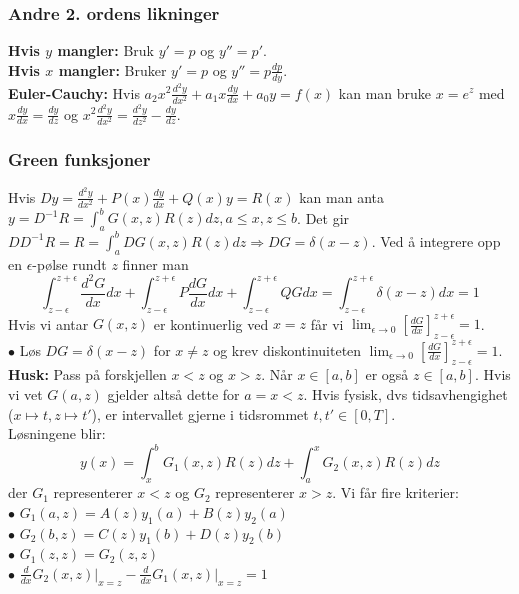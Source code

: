 \documentclass[a4paper, norsk, 8pt]{article}
\newcommand{\DIFF}[2]{ \frac{d#1}{d#2} }
\begin{document}
\begin{multicols*}{2}
\subsubsection*{\small Andre 2. ordens likninger}
\textbf{Hvis $y$ mangler:} Bruk $y'=p$ og $y''=p'$.\\
\textbf{Hvis $x$ mangler:} Bruker $y'=p$ og $y''=p\DIFF{p}{y}$.\\
\textbf{Euler-Cauchy:} Hvis $a_2 x^2 \DIFF{^2y}{x^2} + a_1x\DIFF{y}{x}+a_0y=f(x)$ kan man bruke $x=e^{z}$ med $x\DIFF{y}{x}=\DIFF{y}{z}$ og $x^2\DIFF{^2y}{x^2}=\DIFF{^2y}{z^2}-\DIFF{y}{z}$.

\subsubsection*{\small Green funksjoner}
Hvis $Dy=\DIFF{^2y}{x^2}+P(x)\DIFF{y}{x}+Q(x)y=R(x)$ kan man anta $y=D^{-1}R=\int_{a}^{b}G(x,z)R(z)dz,a\leq x,z\leq b$. Det gir $DD^{-1}R=R=\int_{a}^{b}DG(x,z)R(z)dz\Rightarrow DG=\delta(x-z)$. Ved å integrere opp en $\epsilon$-pølse rundt $z$ finner man 
\[ \int_{z-\epsilon}^{z+\epsilon}\DIFF{^2G}{x}dx+\int_{z-\epsilon}^{z+\epsilon}P\DIFF{G}{x}dx+\int_{z-\epsilon}^{z+\epsilon}QGdx=\int_{z-\epsilon}^{z+\epsilon}\delta(x-z)dx=1 \]
Hvis vi antar $G(x,z)$ er kontinuerlig ved $x=z$ får vi $\lim_{\epsilon\rightarrow 0}\left[\DIFF{G}{x}\right]_{z-\epsilon}^{z+\epsilon}=1$. \\
$\bullet$ Løs $DG=\delta(x-z)$ for $x\neq z$ og krev diskontinuiteten $\lim_{\epsilon\rightarrow 0}\left[\DIFF{G}{x}\right]_{z-\epsilon}^{z+\epsilon}=1$.\\
\textbf{Husk:} Pass på forskjellen $x<z$ og $x>z$. Når $x\in [a,b]$ er også $z\in [a,b]$. Hvis vi vet $G(a,z)$ gjelder altså dette for $a=x<z$. Hvis fysisk, dvs tidsavhengighet ($x\mapsto t, z\mapsto t'$), er intervallet gjerne i tidsrommet $t,t'\in [0,T]$.\\
Løsningene blir: 
\[
y(x)=\int_x^b G_{1}(x,z)R(z)dz+\int_a^x G_{2}(x,z)R(z)dz
\]
der $G_1$ representerer $x<z$ og $G_2$ representerer $x>z$. Vi får fire kriterier: \\
$\bullet$ $G_1(a,z)=A(z)y_1(a)+B(z)y_2(a)$ \\
$\bullet$ $G_2(b,z)=C(z)y_1(b)+D(z)y_2(b)$ \\
$\bullet$ $G_1(z,z)=G_2(z,z)$ \\
$\bullet$ $\DIFF{}{x}G_2(x,z)\big|_{x=z}-\DIFF{}{x}G_1(x,z)\big|_{x=z}=1$


\end{multicols*}
\end{document}
